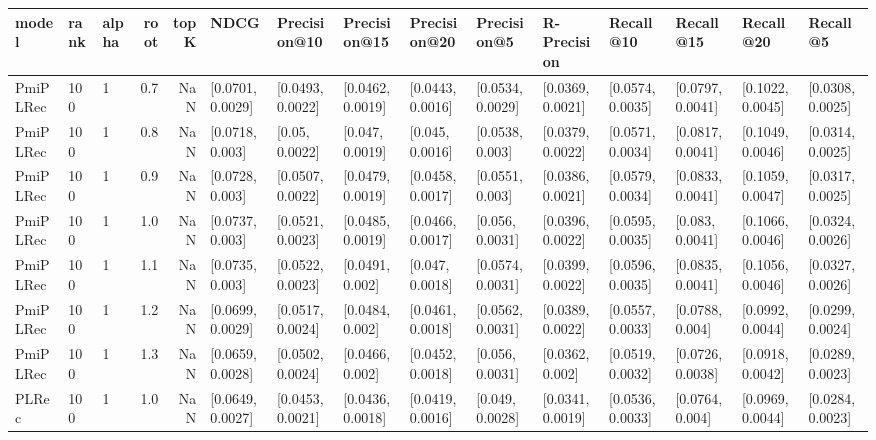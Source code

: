 \begin{tabular}{lllrrllllllllll}
\toprule
     model & rank & alpha &  root &  topK &              NDCG &      Precision@10 &      Precision@15 &      Precision@20 &       Precision@5 &       R-Precision &         Recall@10 &         Recall@15 &         Recall@20 &          Recall@5 \\
\midrule
  PmiPLRec &  100 &     1 &   0.7 &   NaN &  [0.0701, 0.0029] &  [0.0493, 0.0022] &  [0.0462, 0.0019] &  [0.0443, 0.0016] &  [0.0534, 0.0029] &  [0.0369, 0.0021] &  [0.0574, 0.0035] &  [0.0797, 0.0041] &  [0.1022, 0.0045] &  [0.0308, 0.0025] \\
  PmiPLRec &  100 &     1 &   0.8 &   NaN &   [0.0718, 0.003] &    [0.05, 0.0022] &   [0.047, 0.0019] &   [0.045, 0.0016] &   [0.0538, 0.003] &  [0.0379, 0.0022] &  [0.0571, 0.0034] &  [0.0817, 0.0041] &  [0.1049, 0.0046] &  [0.0314, 0.0025] \\
  PmiPLRec &  100 &     1 &   0.9 &   NaN &   [0.0728, 0.003] &  [0.0507, 0.0022] &  [0.0479, 0.0019] &  [0.0458, 0.0017] &   [0.0551, 0.003] &  [0.0386, 0.0021] &  [0.0579, 0.0034] &  [0.0833, 0.0041] &  [0.1059, 0.0047] &  [0.0317, 0.0025] \\
  PmiPLRec &  100 &     1 &   1.0 &   NaN &   [0.0737, 0.003] &  [0.0521, 0.0023] &  [0.0485, 0.0019] &  [0.0466, 0.0017] &   [0.056, 0.0031] &  [0.0396, 0.0022] &  [0.0595, 0.0035] &   [0.083, 0.0041] &  [0.1066, 0.0046] &  [0.0324, 0.0026] \\
  PmiPLRec &  100 &     1 &   1.1 &   NaN &   [0.0735, 0.003] &  [0.0522, 0.0023] &   [0.0491, 0.002] &   [0.047, 0.0018] &  [0.0574, 0.0031] &  [0.0399, 0.0022] &  [0.0596, 0.0035] &  [0.0835, 0.0041] &  [0.1056, 0.0046] &  [0.0327, 0.0026] \\
  PmiPLRec &  100 &     1 &   1.2 &   NaN &  [0.0699, 0.0029] &  [0.0517, 0.0024] &   [0.0484, 0.002] &  [0.0461, 0.0018] &  [0.0562, 0.0031] &  [0.0389, 0.0022] &  [0.0557, 0.0033] &   [0.0788, 0.004] &  [0.0992, 0.0044] &  [0.0299, 0.0024] \\
  PmiPLRec &  100 &     1 &   1.3 &   NaN &  [0.0659, 0.0028] &  [0.0502, 0.0024] &   [0.0466, 0.002] &  [0.0452, 0.0018] &   [0.056, 0.0031] &   [0.0362, 0.002] &  [0.0519, 0.0032] &  [0.0726, 0.0038] &  [0.0918, 0.0042] &  [0.0289, 0.0023] \\
     PLRec &  100 &     1 &   1.0 &   NaN &  [0.0649, 0.0027] &  [0.0453, 0.0021] &  [0.0436, 0.0018] &  [0.0419, 0.0016] &   [0.049, 0.0028] &  [0.0341, 0.0019] &  [0.0536, 0.0033] &   [0.0764, 0.004] &  [0.0969, 0.0044] &  [0.0284, 0.0023] \\

\end{tabular}
